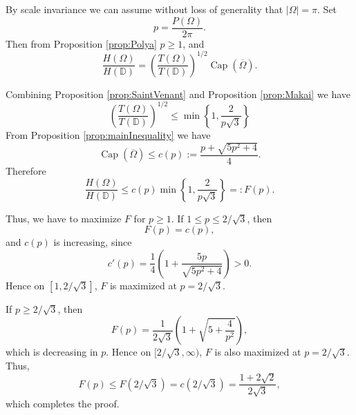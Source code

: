 \documentclass[11pt]{article}
\theoremstyle{plain}
\numberwithin{equation}{section}
\theoremstyle{definition}
\let\oldendproof\endproof
\renewenvironment{proof}[1][\proofname]{%
\oldproof[\upshape \bfseries #1]%
}{\oldendproof}
\DeclareMathOperator{\cp}{Cap}
\def \Om{\Omega}
\def \mb{\mathbb}
\begin{document}
    \begin{proof}
        By scale invariance we can assume without loss of generality that $|\Omega|=\pi$. Set
        \[
        p=\frac{P(\Omega)}{2\pi}.
        \]
        Then from Proposition \ref{prop:Polya} $p\ge 1$, and
        \[
        \frac{H(\Omega)}{H(\mb D)}
        =
        \left(\frac{T(\Omega)}{T(\mb D)}\right)^{1/2}\cp(\overline{\Om}).
        \]
        
        Combining Proposition \ref{prop:SaintVenant} and Proposition \ref{prop:Makai} we have
        \[
        \left(\frac{T(\Omega)}{T(\mb D)}\right)^{1/2}
        \le 
        \min\left\{1,\frac{2}{p\sqrt{3}}\right\}
        \]
        From Proposition \ref{prop:mainInequality} we have
        \[
        \cp(\overline \Om)\le c(p):=\frac{p+\sqrt{5p^{2}+4}}{4}.
        \]
        Therefore
        \[
        \frac{H(\Omega)}{H(\mb D)}
        \le 
        c(p)\min\left\{1,\frac{2}{p\sqrt{3}}\right\}
        =:F(p).
        \]
        
        Thus, we have to maximize $F$ for $p\ge 1$. If $1\le p\le 2/\sqrt{3}$, then
        \[
        F(p)=c(p),
        \]
        and $c(p)$ is increasing, since
        \[
        c'(p)=\frac14\left(1+\frac{5p}{\sqrt{5p^2+4}}\right)>0.
        \]
        Hence on $[1,2/\sqrt{3}]$, $F$ is maximized at $p=2/\sqrt{3}$.
        
        If $p\ge 2/\sqrt{3}$, then
        \[
        F(p)=
        \frac{1}{2\sqrt{3}}\left(1+\sqrt{5+\frac{4}{p^2}}\right),
        \]
        which is decreasing in $p$. Hence on $[2/\sqrt{3},\infty)$, $F$ is also maximized at $p=2/\sqrt{3}$. Thus,
        \[
        F(p)\le F(2/\sqrt{3})=c(2/\sqrt{3})=\frac{1+2\sqrt{2}}{2\sqrt{3}},
        \]
        which completes the proof.
    \end{proof}
\end{document}
